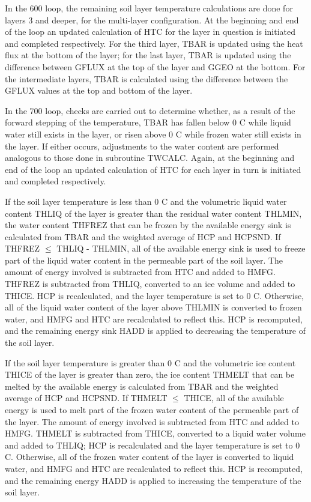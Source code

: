 In the 600 loop, the remaining soil layer temperature calculations are done for layers 3 and deeper, for the multi-\/layer configuration. At the beginning and end of the loop an updated calculation of H\+T\+C for the layer in question is initiated and completed respectively. For the third layer, T\+B\+A\+R is updated using the heat flux at the bottom of the layer; for the last layer, T\+B\+A\+R is updated using the difference between G\+F\+L\+U\+X at the top of the layer and G\+G\+E\+O at the bottom. For the intermediate layers, T\+B\+A\+R is calculated using the difference between the G\+F\+L\+U\+X values at the top and bottom of the layer.

In the 700 loop, checks are carried out to determine whether, as a result of the forward stepping of the temperature, T\+B\+A\+R has fallen below 0 C while liquid water still exists in the layer, or risen above 0 C while frozen water still exists in the layer. If either occurs, adjustments to the water content are performed analogous to those done in subroutine T\+W\+C\+A\+L\+C. Again, at the beginning and end of the loop an updated calculation of H\+T\+C for each layer in turn is initiated and completed respectively.

If the soil layer temperature is less than 0 C and the volumetric liquid water content T\+H\+L\+I\+Q of the layer is greater than the residual water content T\+H\+L\+M\+I\+N, the water content T\+H\+F\+R\+E\+Z that can be frozen by the available energy sink is calculated from T\+B\+A\+R and the weighted average of H\+C\+P and H\+C\+P\+S\+N\+D. If T\+H\+F\+R\+E\+Z $\leq$ T\+H\+L\+I\+Q -\/ T\+H\+L\+M\+I\+N, all of the available energy sink is used to freeze part of the liquid water content in the permeable part of the soil layer. The amount of energy involved is subtracted from H\+T\+C and added to H\+M\+F\+G. T\+H\+F\+R\+E\+Z is subtracted from T\+H\+L\+I\+Q, converted to an ice volume and added to T\+H\+I\+C\+E. H\+C\+P is recalculated, and the layer temperature is set to 0 C. Otherwise, all of the liquid water content of the layer above T\+H\+L\+M\+I\+N is converted to frozen water, and H\+M\+F\+G and H\+T\+C are recalculated to reflect this. H\+C\+P is recomputed, and the remaining energy sink H\+A\+D\+D is applied to decreasing the temperature of the soil layer.

If the soil layer temperature is greater than 0 C and the volumetric ice content T\+H\+I\+C\+E of the layer is greater than zero, the ice content T\+H\+M\+E\+L\+T that can be melted by the available energy is calculated from T\+B\+A\+R and the weighted average of H\+C\+P and H\+C\+P\+S\+N\+D. If T\+H\+M\+E\+L\+T $\leq$ T\+H\+I\+C\+E, all of the available energy is used to melt part of the frozen water content of the permeable part of the layer. The amount of energy involved is subtracted from H\+T\+C and added to H\+M\+F\+G. T\+H\+M\+E\+L\+T is subtracted from T\+H\+I\+C\+E, converted to a liquid water volume and added to T\+H\+L\+I\+Q; H\+C\+P is recalculated and the layer temperature is set to 0 C. Otherwise, all of the frozen water content of the layer is converted to liquid water, and H\+M\+F\+G and H\+T\+C are recalculated to reflect this. H\+C\+P is recomputed, and the remaining energy H\+A\+D\+D is applied to increasing the temperature of the soil layer.

